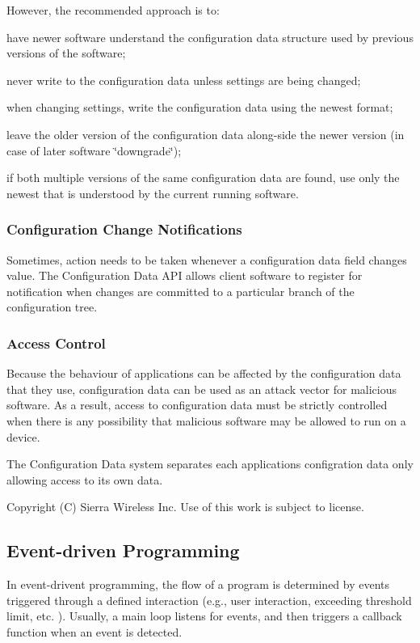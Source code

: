 However, the recommended approach is to\+:
\begin{DoxyItemize}
\item have newer software understand the configuration data structure used by previous versions of the software;
\item never write to the configuration data unless settings are being changed;
\item when changing settings, write the configuration data using the newest format;
\item leave the older version of the configuration data along-\/side the newer version (in case of later software \char`\"{}downgrade\char`\"{});
\item if both multiple versions of the same configuration data are found, use only the newest that is understood by the current running software.
\end{DoxyItemize}\hypertarget{basic_config_configChangeNotification}{}\subsubsection{Configuration Change Notifications}\label{basic_config_configChangeNotification}
Sometimes, action needs to be taken whenever a configuration data field changes value. The Configuration Data A\+P\+I allows client software to register for notification when changes are committed to a particular branch of the configuration tree.\hypertarget{basic_config_accessControl}{}\subsubsection{Access Control}\label{basic_config_accessControl}
Because the behaviour of applications can be affected by the configuration data that they use, configuration data can be used as an attack vector for malicious software. As a result, access to configuration data must be strictly controlled when there is any possibility that malicious software may be allowed to run on a device.

The Configuration Data system separates each applications\textquotesingle{} configration data only allowing access to its own data.





Copyright (C) Sierra Wireless Inc. Use of this work is subject to license. \hypertarget{basicEvents}{}\subsection{Event-\/driven Programming}\label{basicEvents}
In event-\/drivent programming, the flow of a program is determined by events triggered through a defined interaction (e.\+g., user interaction, exceeding threshold limit, etc. ). Usually, a main loop listens for events, and then triggers a callback function when an event is detected.

